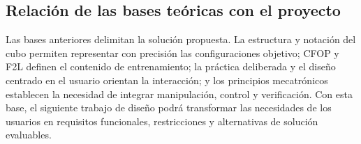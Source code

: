 \subsection{Relación de las bases teóricas con el proyecto}

Las bases anteriores delimitan la solución propuesta. La estructura y notación del cubo permiten representar con precisión las configuraciones objetivo; CFOP y F2L definen el contenido de entrenamiento; la práctica deliberada y el diseño centrado en el usuario orientan la interacción; y los principios mecatrónicos establecen la necesidad de integrar manipulación, control y verificación. Con esta base, el siguiente trabajo de diseño podrá transformar las necesidades de los usuarios en requisitos funcionales, restricciones y alternativas de solución evaluables.

\clearpage
